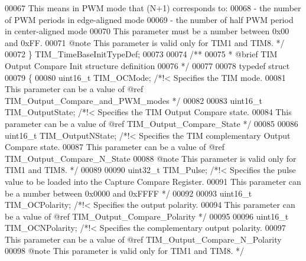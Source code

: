 \begin{DoxyCode}
00067 \textcolor{comment}{                                       This means in PWM mode that (N+1) corresponds to:}
00068 \textcolor{comment}{                                          - the number of PWM periods in edge-aligned mode}
00069 \textcolor{comment}{                                          - the number of half PWM period in center-aligned mode}
00070 \textcolor{comment}{                                       This parameter must be a number between 0x00 and 0xFF. }
00071 \textcolor{comment}{                                       @note This parameter is valid only for TIM1 and TIM8. */}
00072 \} TIM\_TimeBaseInitTypeDef;
00073 
00074 \textcolor{comment}{/** }
00075 \textcolor{comment}{  * @brief  TIM Output Compare Init structure definition  }
00076 \textcolor{comment}{  */}
00077 
00078 \textcolor{keyword}{typedef} \textcolor{keyword}{struct}
00079 \{
00080   uint16\_t TIM_OCMode;        \textcolor{comment}{/*!< Specifies the TIM mode.}
00081 \textcolor{comment}{                                   This parameter can be a value of @ref
       TIM\_Output\_Compare\_and\_PWM\_modes */}
00082 
00083   uint16\_t TIM_OutputState;   \textcolor{comment}{/*!< Specifies the TIM Output Compare state.}
00084 \textcolor{comment}{                                   This parameter can be a value of @ref TIM\_Output\_Compare\_State */}
00085 
00086   uint16\_t TIM_OutputNState;  \textcolor{comment}{/*!< Specifies the TIM complementary Output Compare state.}
00087 \textcolor{comment}{                                   This parameter can be a value of @ref TIM\_Output\_Compare\_N\_State}
00088 \textcolor{comment}{                                   @note This parameter is valid only for TIM1 and TIM8. */}
00089 
00090   uint32\_t TIM_Pulse;         \textcolor{comment}{/*!< Specifies the pulse value to be loaded into the Capture Compare
       Register. }
00091 \textcolor{comment}{                                   This parameter can be a number between 0x0000 and 0xFFFF */}
00092 
00093   uint16\_t TIM_OCPolarity;    \textcolor{comment}{/*!< Specifies the output polarity.}
00094 \textcolor{comment}{                                   This parameter can be a value of @ref TIM\_Output\_Compare\_Polarity
       */}
00095 
00096   uint16\_t TIM_OCNPolarity;   \textcolor{comment}{/*!< Specifies the complementary output polarity.}
00097 \textcolor{comment}{                                   This parameter can be a value of @ref TIM\_Output\_Compare\_N\_Polarity}
00098 \textcolor{comment}{                                   @note This parameter is valid only for TIM1 and TIM8. */}

\end{DoxyCode}
